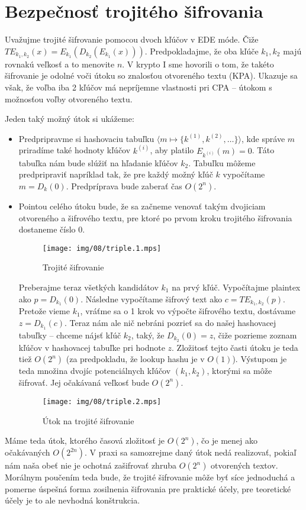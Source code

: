 \section{Bezpečnosť trojitého šifrovania}

Uvažujme trojité šifrovanie pomocou dvoch kľúčov v EDE móde.
Čiže $TE_{k_1,k_2} (x) = E_{k_1}(D_{k_2}(E_{k_1}(x)))$.
Predpokladajme, že oba kľúče $k_1, k_2$ majú rovnakú veľkosť a to
menovite $n$.
V krypto I sme hovorili o tom, že takéto šifrovanie je odolné voči
útoku so znalosťou otvoreného textu (KPA).
Ukazuje sa však, že voľba iba 2 kľúčov má nepríjemne vlastnosti pri
CPA -- útokom s možnosťou voľby otvoreného textu.

Jeden taký možný útok si ukážeme:
\begin{itemize}
    \item Predpripravme si hashovaciu tabuľku
        $\langle m \mapsto \{k^{(1)}, k^{(2)}, \dots \} \rangle$,
        kde správe $m$ priradíme také hodnoty kľúčov $k^{(i)}$,
        aby platilo $E_{k^{(i)}}(m)=0$. Táto tabuľka nám bude slúžiť
        na hľadanie kľúčov $k_2$.
        Tabuľku môžeme predpripraviť napríklad tak, že pre každý možný
        kľúč $k$ vypočítame $m=D_k(0)$. Predpríprava bude zaberať čas
        $O(2^n)$.
    \item Pointou celého útoku bude, že sa začneme venovať takým
        dvojiciam otvoreného a šifrového textu, pre ktoré po prvom kroku
        trojitého šifrovania dostaneme číslo 0.
        \begin{figure}[h]
            \centering
            \texttt{[image: img/08/triple.1.mps]}
            \caption{Trojité šifrovanie}
            \label{fig:triple}
        \end{figure}
        Preberajme teraz všetkých kandidátov $k_1$ na prvý kľúč.
        Vypočítajme plaintex ako $p=D_{k_1}(0)$.
        Následne vypočítame šifrový text ako $c=TE_{k_1,k_2}(p)$.
        Pretože vieme $k_1$, vráťme sa o 1 krok vo výpočte šifrového
        textu, dostávame $z=D_{k_1}(c)$.
        Teraz nám ale nič nebráni pozrieť sa do našej hashovacej
        tabuľky -- chceme nájsť kľúč $k_2$, taký, že
        $D_{k_2}(0) = z$, čiže pozrieme zoznam kľúčov v hashovacej
        tabuľke pri hodnote $z$.
        Zložitosť tejto časti útoku je teda tiež $O(2^n)$ (za
        predpokladu, že lookup hashu je v $O(1)$).
        Výstupom je teda množina dvojíc potenciálnych kľúčov
        $(k_1,k_2)$, ktorými sa môže šifrovať.
        Jej očakávaná veľkosť bude $O(2^n)$.
        \begin{figure}[h]
            \centering
            \texttt{[image: img/08/triple.2.mps]}
            \caption{Útok na trojité šifrovanie}
            \label{fig:triple-attack}
        \end{figure}
\end{itemize}
Máme teda útok, ktorého časová zložitosť je $O(2^n)$, čo je menej ako
očakávaných $O(2^{2n})$. V praxi sa samozrejme daný útok nedá
realizovať, pokiaľ nám naša obeť nie je ochotná zašifrovať zhruba
$O(2^n)$ otvorených textov. Morálnym poučením teda bude, že trojité
šifrovanie môže byť síce jednoduchá a pomerne úspešná forma zosilnenia
šifrovania pre praktické účely, pre teoretické účely je to ale
nevhodná konštrukcia.
